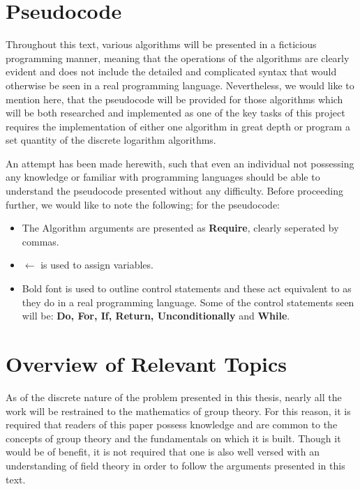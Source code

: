 \documentclass[iwp,first]{luthesis}
\begin{document}
\chapter{Pseudocode}

Throughout this text, various algorithms will be presented in a ficticious programming manner, meaning that the operations of the algorithms are clearly evident and does not include the detailed and complicated syntax that would otherwise be seen in a real programming language.  Nevertheless, we would like to mention here, that the pseudocode will be provided for those algorithms which will be both researched and implemented as one of the key tasks of this project requires the implementation of either one algorithm in great depth or program a set quantity of the discrete logarithm algorithms. 

An attempt has been made herewith, such that even an individual not possessing any knowledge or familiar with programming languages should be able to understand the pseudocode presented without any difficulty. Before proceeding further, we would like to note the following; for the pseudocode:

\begin{itemize}

\item The Algorithm arguments are presented as \textbf{Require}, clearly seperated by commas.

\item $\leftarrow$ is used to assign variables.

\item Bold font is used to outline control statements and these act equivalent to as they do in a real programming language. Some of the control statements seen will be: \textbf{Do, For, If, Return, Unconditionally} and \textbf{While}.

\end{itemize}

\tableofcontents

\mainmatter
\chapter{Overview of Relevant Topics}

As of the discrete nature of the problem presented in this thesis, nearly all the work will be restrained to the mathematics of group theory. For this reason, it is required that readers of this paper possess knowledge and are common to the concepts of group theory and the fundamentals on which it is built. Though it would be of benefit, it is not required that one is also well versed with an understanding of field theory in order to follow the arguments presented in this text.
\end{document}
